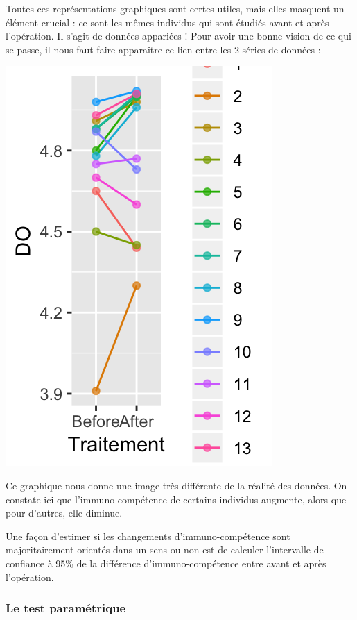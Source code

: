 \documentclass[a4paperpaper,]{article}
\newenvironment{Shaded}{\begin{snugshade}}{\end{snugshade}}
\newcommand{\DataTypeTok}[1]{\textcolor[rgb]{0.00,0.34,0.68}{#1}}
\newcommand{\FloatTok}[1]{\textcolor[rgb]{0.69,0.50,0.00}{#1}}
\newcommand{\KeywordTok}[1]{\textcolor[rgb]{0.12,0.11,0.11}{\textbf{#1}}}
\newcommand{\NormalTok}[1]{\textcolor[rgb]{0.12,0.11,0.11}{#1}}
\newcommand{\OperatorTok}[1]{\textcolor[rgb]{0.12,0.11,0.11}{#1}}
\newcommand{\StringTok}[1]{\textcolor[rgb]{0.75,0.01,0.01}{#1}}
\begin{document}
Toutes ces représentations graphiques sont certes utiles, mais elles masquent un élément crucial : ce sont les mêmes individus qui sont étudiés avant et après l'opération. Il s'agit de données appariées ! Pour avoir une bonne vision de ce qui se passe, il nous faut faire apparaître ce lien entre les 2 séries de données :

\begin{Shaded}
\end{Shaded}

\begin{center}\includegraphics[width=0.25\linewidth]{figure/unnamed-chunk-37-1} \end{center}

Ce graphique nous donne une image très différente de la réalité des données. On constate ici que l'immuno-compétence de certains individus augmente, alors que pour d'autres, elle diminue.

Une façon d'estimer si les changements d'immuno-compétence sont majoritairement orientés dans un sens ou non est de calculer l'intervalle de confiance à 95\% de la différence d'immuno-compétence entre avant et après l'opération.

\hypertarget{le-test-parametrique-1}{%
\subsubsection{Le test paramétrique}\label{le-test-parametrique-1}}
\end{document}
